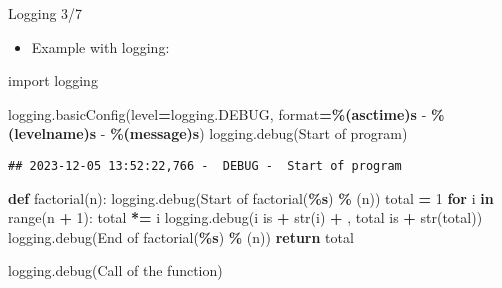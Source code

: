 \documentclass[
  8pt,
  ignorenonframetext,
]{beamer}
\newenvironment{Shaded}{\begin{snugshade}}{\end{snugshade}}
\newcommand{\BuiltInTok}[1]{#1}
\newcommand{\ControlFlowTok}[1]{\textcolor[rgb]{0.13,0.29,0.53}{\textbf{#1}}}
\newcommand{\DecValTok}[1]{\textcolor[rgb]{0.00,0.00,0.81}{#1}}
\newcommand{\ImportTok}[1]{#1}
\newcommand{\KeywordTok}[1]{\textcolor[rgb]{0.13,0.29,0.53}{\textbf{#1}}}
\newcommand{\NormalTok}[1]{#1}
\newcommand{\OperatorTok}[1]{\textcolor[rgb]{0.81,0.36,0.00}{\textbf{#1}}}
\newcommand{\SpecialCharTok}[1]{\textcolor[rgb]{0.81,0.36,0.00}{\textbf{#1}}}
\newcommand{\StringTok}[1]{\textcolor[rgb]{0.31,0.60,0.02}{#1}}
\providecommand{\tightlist}{%
  \setlength{\itemsep}{0pt}\setlength{\parskip}{0pt}}
\begin{document}
\begin{frame}[fragile]{Logging 3/7}
\protect\hypertarget{logging-37}{}
\begin{itemize}
\tightlist
\item
  Example with logging:
\end{itemize}

\begin{Shaded}
\begin{Highlighting}[]
\ImportTok{import}\NormalTok{ logging}

\NormalTok{logging.basicConfig(level}\OperatorTok{=}\NormalTok{logging.DEBUG, }\BuiltInTok{format}\OperatorTok{=}\StringTok{\textquotesingle{}}\SpecialCharTok{\%(asctime)s}\StringTok{ {-}  }\SpecialCharTok{\%(levelname)s}\StringTok{ {-}  }\SpecialCharTok{\%(message)s}\StringTok{\textquotesingle{}}\NormalTok{)}
\NormalTok{logging.debug(}\StringTok{\textquotesingle{}Start of program\textquotesingle{}}\NormalTok{)}
\end{Highlighting}
\end{Shaded}

\begin{verbatim}
## 2023-12-05 13:52:22,766 -  DEBUG -  Start of program
\end{verbatim}

\begin{Shaded}
\begin{Highlighting}[]
\KeywordTok{def}\NormalTok{ factorial(n):}
\NormalTok{    logging.debug(}\StringTok{\textquotesingle{}Start of factorial(}\SpecialCharTok{\%s}\StringTok{)\textquotesingle{}}  \OperatorTok{\%}\NormalTok{ (n))}
\NormalTok{    total }\OperatorTok{=} \DecValTok{1}
    \ControlFlowTok{for}\NormalTok{ i }\KeywordTok{in} \BuiltInTok{range}\NormalTok{(n }\OperatorTok{+} \DecValTok{1}\NormalTok{):}
\NormalTok{        total }\OperatorTok{*=}\NormalTok{ i}
\NormalTok{        logging.debug(}\StringTok{\textquotesingle{}i is \textquotesingle{}} \OperatorTok{+} \BuiltInTok{str}\NormalTok{(i) }\OperatorTok{+} \StringTok{\textquotesingle{}, total is \textquotesingle{}} \OperatorTok{+} \BuiltInTok{str}\NormalTok{(total))}
\NormalTok{    logging.debug(}\StringTok{\textquotesingle{}End of factorial(}\SpecialCharTok{\%s}\StringTok{)\textquotesingle{}}  \OperatorTok{\%}\NormalTok{ (n))}
    \ControlFlowTok{return}\NormalTok{ total}

\NormalTok{logging.debug(}\StringTok{\textquotesingle{}Call of the function\textquotesingle{}}\NormalTok{)}
\end{Highlighting}
\end{Shaded}


\end{frame}
\end{document}
